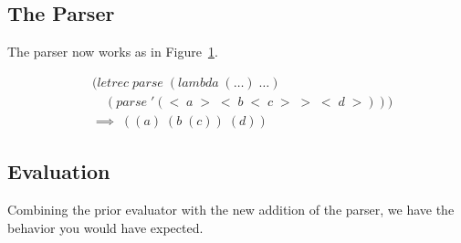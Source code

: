 \subsection{The Parser}
The parser now works as in Figure~\ref{fig:parserExample}. 

\begin{figure}[htp]
\caption{}\label{fig:parserExample}
\begin{align*}
& (letrec \; parse \; (lambda \; (\dots) \; \dots)
\\& \quad (parse \; '(< \; a \; > \; < \; b \; < \; c \; > \; > \; < \; d \; >)))
\\& \implies \; ((a) \; (b \; (c)) \; (d))
\end{align*}
\end{figure}

\subsection{Evaluation}
Combining the prior evaluator with the new addition of the parser, we have the behavior you would have expected.
